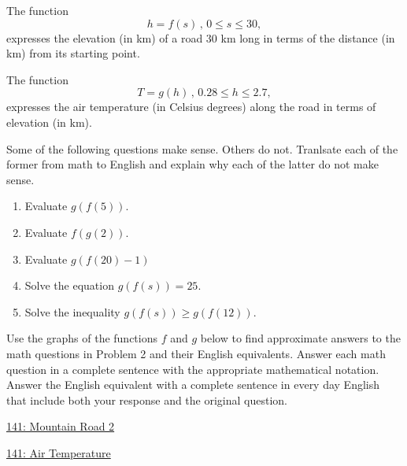 \documentclass{ximera}
\begin{document}
\begin{question} \label{Qpfpr33}
The function
\[
   h = f(s) \, , \, 0\leq s \leq 30 ,
\]
expresses the elevation (in km) of a road $30$ km long in terms of the distance (in km) from its starting point.

The function
\[
 T = g(h) \, , \, 0.28 \leq h \leq 2.7 ,
\]
expresses the air temperature (in Celsius degrees) along the road in terms of elevation (in km). 

Some of the following questions make sense. Others do not. Tranlsate each of the former from math to English and explain why each of the latter do not make sense.

\begin{enumerate}
\item Evaluate $g(f(5))$.

\item Evaluate $f(g(2))$.


\item Evaluate $g(f(20)-1)$

\item Solve the equation $g(f(s))=25$.

\item Solve the inequality $g(f(s)) \geq g(f(12))$.

\end{enumerate}

\end{question}

\begin{question} \label{Ws229}
Use the graphs of the functions $f$ and $g$ below to find approximate answers to the math questions in Problem 2 and their English equivalents. Answer each math question in a complete sentence with the appropriate mathematical notation. Answer the English equivalent with a complete sentence in every day English that include both your response and the original question.


\begin{onlineOnly}
    \begin{center}
\end{center}
\end{onlineOnly}

\href{https://www.desmos.com/calculator/vn9n75zwjx}{141: Mountain Road 2}

\begin{onlineOnly}
    \begin{center}
\end{center}
\end{onlineOnly}

\href{https://www.desmos.com/calculator/qfiqp5idzc}{141: Air Temperature}
\end{question}
\end{document}
